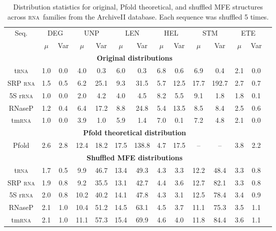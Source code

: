 \documentclass{article}
\newcommand{\RNA}{\textsc{rna}}
\begin{document}
\begin{table}[h]
\centering
\begin{tabular}{cccccccccccccc}
\toprule
\multicolumn{1}{c}{Seq.} 
  & \multicolumn{2}{c}{DEG}
  & \multicolumn{2}{c}{UNP}
  & \multicolumn{2}{c}{LEN}
  & \multicolumn{2}{c}{HEL}
  & \multicolumn{2}{c}{STM}
  & \multicolumn{2}{c}{ETE}\\
  & $\mu$ & Var & $\mu$ & Var & $\mu$ & Var & $\mu$ & Var & $\mu$ & Var & $\mu$ & Var \\
\cmidrule(l){1-13}

\multicolumn{13}{c}{\textbf{Original distributions}} \\
\cmidrule(l){1-13}

t\RNA      & 1.0 & 0.0 & 4.0 & 0.3 & 6.0 & 0.3 & 6.8 & 0.6 & 6.9 & 0.4 & 2.1 & 0.0 \\
SRP \RNA   & 1.5 & 0.5 & 6.2 & 25.1 & 9.3 & 31.5 & 5.7 & 12.5 & 17.7 & 192.7 & 2.7 & 0.7 \\
5S r\RNA   & 1.0 & 0.0 & 2.0 & 4.2 & 4.0 & 4.5 & 8.2 & 5.5 & 9.1 & 1.8 & 1.8 & 0.1 \\
RNaseP    & 1.2 & 0.4 & 6.4 & 17.2 & 8.8 & 24.8 & 5.4 & 13.5 & 8.5 & 8.4 & 2.5 & 0.6 \\
tm\RNA     & 1.0 & 0.0 & 3.9 & 1.0 & 5.9 & 1.4 & 7.0 & 0.1 & 7.2 & 4.8 & 2.1 & 0.0 \\

\cmidrule(l){1-13}
\multicolumn{13}{c}{\textbf{Pfold theoretical distribution}} \\
\cmidrule(l){1-13}

Pfold & 2.6 & 2.8 & 12.4 & 18.2 & 17.5 & 138.8 & 4.7 & 17.5 & -- & -- & 3.8 & 2.2 \\

\cmidrule(l){1-13}
\multicolumn{13}{c}{\textbf{Shuffled MFE distributions}} \\
\cmidrule(l){1-13}

t\RNA      & 1.7 & 0.5 & 9.9 & 46.7 & 13.4 & 49.3 & 4.3 & 3.3 & 12.2 & 48.4 & 3.3 & 0.8 \\
SRP \RNA   & 1.9 & 0.8 & 9.2 & 35.5 & 13.1 & 42.7 & 4.4 & 3.6 & 12.7 & 82.1 & 3.3 & 0.8 \\
5S r\RNA   & 2.0 & 0.8 & 10.2 & 40.2 & 14.1 & 47.8 & 4.3 & 3.1 & 12.5 & 78.4 & 3.4 & 0.9 \\
RNaseP    & 2.1 & 1.0 & 10.4 & 51.2 & 14.5 & 63.1 & 4.5 & 3.7 & 11.1 & 75.3 & 3.5 & 1.1 \\
tm\RNA     & 2.1 & 1.0 & 11.1 & 57.3 & 15.4 & 69.9 & 4.6 & 4.0 & 11.8 & 84.4 & 3.6 & 1.1 \\

\bottomrule
\end{tabular}
\caption{Distribution statistics for original, Pfold theoretical, and shuffled MFE structures across \RNA\ families from the ArchiveII database.  Each sequence was shuffled 5 times.}
\label{table:ArchiveIIStatistics}
\end{table}
\end{document}
